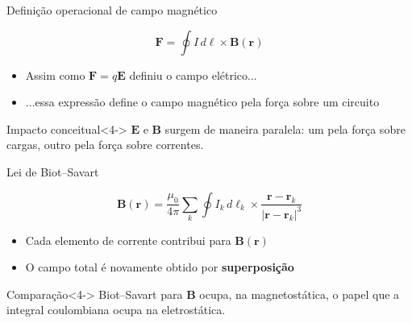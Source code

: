 \documentclass[aspectratio=169]{beamer}
\begin{document}
\begin{frame}{Definição operacional de campo magnético}

\begin{equation}
\mathbf{F} = \oint I\, d\boldsymbol{\ell} \times \mathbf{B}(\mathbf{r})
\tag{2.24}
\end{equation}

\begin{itemize}
\item<2-> Assim como \(\mathbf F = q\mathbf E\) definiu o campo elétrico...
\item<3-> ...essa expressão define o campo magnético pela força sobre um circuito
\end{itemize}

\begin{alertblock}{Impacto conceitual}<4->
\(\mathbf E\) e \(\mathbf B\) surgem de maneira paralela:
um pela força sobre cargas, outro pela força sobre correntes.
\end{alertblock}

\end{frame}

\begin{frame}{Lei de Biot--Savart}

\begin{equation}
\mathbf{B}(\mathbf{r}) =
\frac{\mu_0}{4\pi}
\sum_k \oint I_k\, d\boldsymbol{\ell}_k
\times
\frac{\mathbf{r}-\mathbf{r}_k}{|\mathbf{r}-\mathbf{r}_k|^3}
\tag{2.25}
\end{equation}

\begin{itemize}
\item<2-> Cada elemento de corrente contribui para \(\mathbf B(\mathbf r)\)
\item<3-> O campo total é novamente obtido por \textbf{superposição}
\end{itemize}

\begin{alertblock}{Comparação}<4->
Biot--Savart para \(\mathbf B\) ocupa, na magnetostática,
o papel que a integral coulombiana ocupa na eletrostática.
\end{alertblock}

\end{frame}
\end{document}

